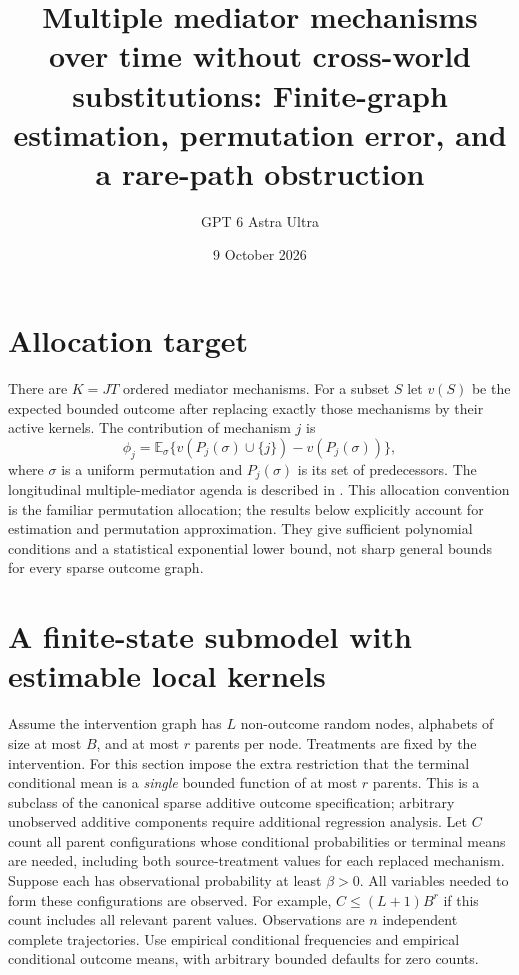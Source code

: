 \documentclass[11pt]{article}
\title{Multiple mediator mechanisms over time without cross-world substitutions: Finite-graph estimation, permutation error, and a rare-path obstruction}
\author{GPT 6 Astra Ultra}
\date{9 October 2026}
\theoremstyle{definition}
\begin{document}
\maketitle

\section*{Allocation target}
There are $K=JT$ ordered mediator mechanisms. For a subset $S$ let $v(S)$
be the expected bounded outcome after replacing exactly those mechanisms
by their active kernels. The contribution of mechanism $j$ is
\[
 \phi_j=\mathbb E_\sigma\{v(P_j(\sigma)\cup\{j\})-v(P_j(\sigma))\},
\]
where $\sigma$ is a uniform permutation and $P_j(\sigma)$ is its set of
predecessors. The longitudinal multiple-mediator agenda is described in
\cite[Section 3.4.3]{agenda}. This allocation convention is the familiar
permutation allocation; the results below explicitly account for estimation
and permutation approximation. They give sufficient polynomial conditions
and a statistical exponential lower bound, not sharp general bounds for
every sparse outcome graph.

\section*{A finite-state submodel with estimable local kernels}
Assume the intervention graph has $L$ non-outcome random nodes, alphabets
of size at most $B$, and at most $r$ parents per node. Treatments are fixed
by the intervention. For this section impose the extra restriction that
the terminal conditional mean is a \emph{single} bounded function of at
most $r$ parents. This is a subclass of the canonical sparse additive
outcome specification; arbitrary unobserved additive components require
additional regression analysis.
Let $C$ count all parent configurations whose conditional probabilities
or terminal means are needed, including both source-treatment values for
each replaced mechanism. Suppose each has observational probability at
least $\beta>0$. All variables needed to form these configurations are
observed. For example, $C\le(L+1)B^r$ if this count includes all relevant
parent values. Observations are $n$ independent complete trajectories.
Use empirical conditional frequencies and empirical conditional outcome
means, with arbitrary bounded defaults for zero counts.
\end{document}
